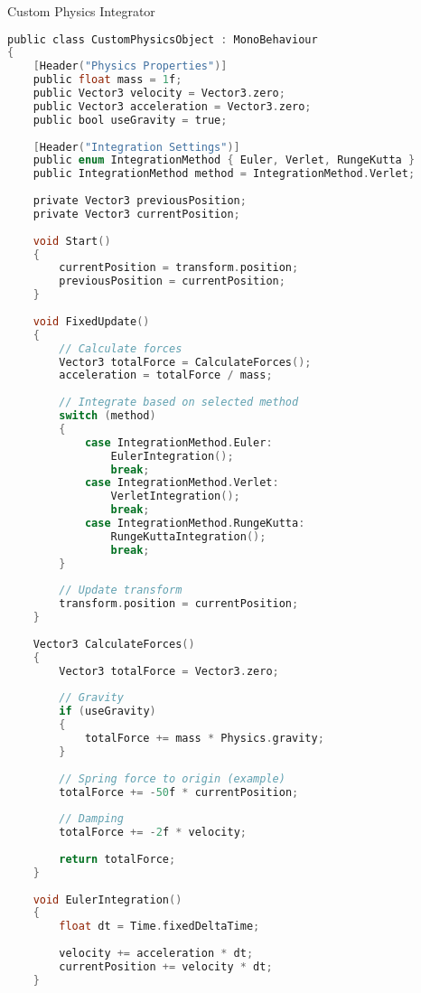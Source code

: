 \begin{code}{Custom Physics Integrator}\\
\begin{lstlisting}[language=C, style=basesmol]
public class CustomPhysicsObject : MonoBehaviour 
{
    [Header("Physics Properties")]
    public float mass = 1f;
    public Vector3 velocity = Vector3.zero;
    public Vector3 acceleration = Vector3.zero;
    public bool useGravity = true;
    
    [Header("Integration Settings")]
    public enum IntegrationMethod { Euler, Verlet, RungeKutta }
    public IntegrationMethod method = IntegrationMethod.Verlet;
    
    private Vector3 previousPosition;
    private Vector3 currentPosition;
    
    void Start() 
    {
        currentPosition = transform.position;
        previousPosition = currentPosition;
    }
    
    void FixedUpdate() 
    {
        // Calculate forces
        Vector3 totalForce = CalculateForces();
        acceleration = totalForce / mass;
        
        // Integrate based on selected method
        switch (method) 
        {
            case IntegrationMethod.Euler:
                EulerIntegration();
                break;
            case IntegrationMethod.Verlet:
                VerletIntegration();
                break;
            case IntegrationMethod.RungeKutta:
                RungeKuttaIntegration();
                break;
        }
        
        // Update transform
        transform.position = currentPosition;
    }
    
    Vector3 CalculateForces() 
    {
        Vector3 totalForce = Vector3.zero;
        
        // Gravity
        if (useGravity) 
        {
            totalForce += mass * Physics.gravity;
        }
        
        // Spring force to origin (example)
        totalForce += -50f * currentPosition;
        
        // Damping
        totalForce += -2f * velocity;
        
        return totalForce;
    }
    
    void EulerIntegration() 
    {
        float dt = Time.fixedDeltaTime;
        
        velocity += acceleration * dt;
        currentPosition += velocity * dt;
    }
    

\end{lstlisting}
\end{code}
